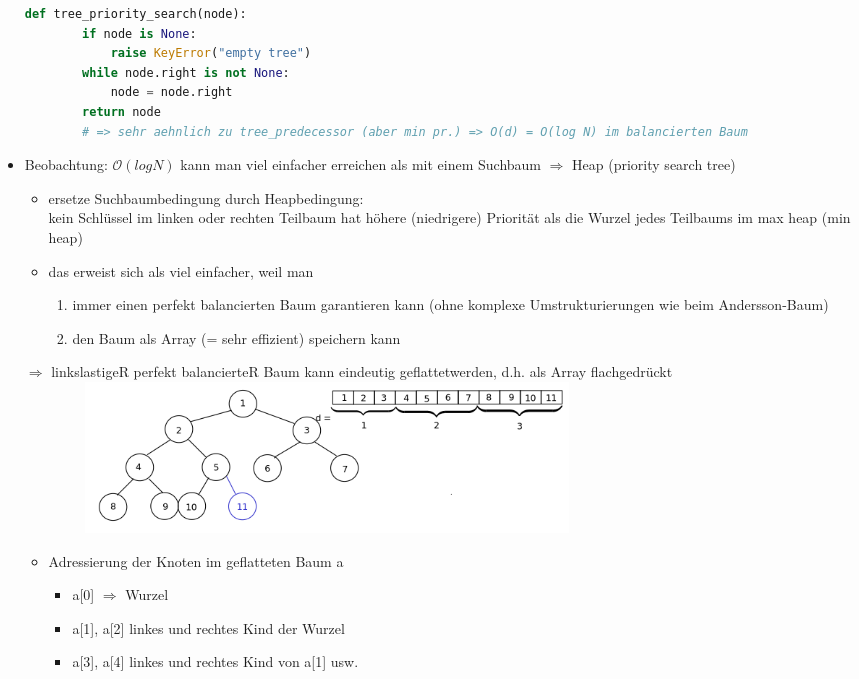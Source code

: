 \documentclass[11pt, fleqn]{scrreprt}
\begin{document}
\begin{itemize}
		\begin{lstlisting}[language=Python]
	def tree_priority_search(node):
		if node is None:
			raise KeyError("empty tree")
		while node.right is not None:
			node = node.right
		return node
		# => sehr aehnlich zu tree_predecessor (aber min pr.) => O(d) = O(log N) im balancierten Baum
		\end{lstlisting}
		\item Beobachtung: $\mathcal{O}(logN)$ kann man viel einfacher erreichen als mit einem Suchbaum $\Rightarrow$ Heap (\glqq priority search tree\grqq  )
		\begin{itemize}
			\item ersetze Suchbaumbedingung durch Heapbedingung: \\
			\glqq kein Schlüssel im linken oder rechten Teilbaum hat höhere (niedrigere) Priorität als die Wurzel jedes Teilbaums im max heap (min heap)\grqq
			\item das erweist sich als viel einfacher, weil man
			\begin{enumerate}
				\item immer einen perfekt balancierten Baum garantieren kann (ohne komplexe Umstrukturierungen wie beim Andersson-Baum)
				\item den Baum als Array (= sehr effizient) speichern kann
			\end{enumerate}
		\end{itemize}
		$\Rightarrow$ linkslastigeR perfekt balancierteR Baum kann eindeutig \glqq geflattet\grqq werden, d.h. als Array \glqq flachgedrückt\grqq 
		\includegraphics[width=16cm,height=4cm,keepaspectratio]{./Pictures/Flatten.png}
		\begin{itemize}
			\item Adressierung der Knoten im geflatteten Baum a \\
			\begin{itemize}
				\item a[0] $\Rightarrow$ Wurzel
				\item a[1], a[2] linkes und rechtes Kind der Wurzel
				\item a[3], a[4] linkes und rechtes Kind von a[1] usw.

\end{itemize}
\end{itemize}
\end{itemize}
\end{document}

